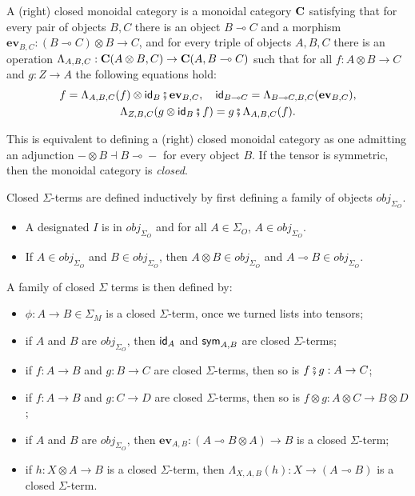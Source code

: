 \begin{definition}%
	\label{def:closed}
	A (right) closed monoidal category is a monoidal category $\mathbf{C}$ satisfying that for
	every pair of objects $B,C$ there is an object $B \multimap C$ and a morphism $\textbf{ev}_{B,C} : (B \multimap C) \otimes B \to
		C$, and for every triple of objects $A,B,C$ there is an operation $\Lambda_{A,B,C} : \mathbf{C}(A \otimes B,C) \to
		\mathbf{C}(A,B \multimap{} C)$ such that for all $f : A \otimes B \to C$ and $g : Z \to A$ the following equations hold:
	\begin{gather*}
		f = \Lambda_{A,B,C}(f) \otimes \textsf{id}_{B} \fatsemi \textbf{ev}_{B,C},
		\quad
		\textsf{id}_{B \multimap{} C} = \Lambda_{B \multimap{} C,B,C}(\textbf{ev}_{B,C}),
		\\
		\Lambda_{Z,B,C}(g \otimes \textsf{id}_{B} \fatsemi f) = g \fatsemi \Lambda_{A,B,C}(f).
	\end{gather*}
\end{definition}

This is equivalent to defining a (right) closed monoidal category as one admitting an adjunction $- \otimes B \dashv B \multimap{} -$ for every object $B$.
If the tensor is symmetric, then the monoidal category is \emph{closed}.

\begin{definition}
	Closed $\Sigma$-terms are defined inductively by first defining a family of objects $obj_{\Sigma_{O}}$.
	\begin{itemize}
		\item A designated $I$ is in $obj_{\Sigma_{O}}$ and for all $A \in \Sigma_{O}$, $A \in obj_{\Sigma_{O}}$.
		\item If $A \in obj_{\Sigma_{O}}$ and $B \in obj_{\Sigma_{O}}$, then $A \otimes B \in obj_{\Sigma_{O}}$ and $A \multimap B \in obj_{\Sigma_{O}}$.
	\end{itemize}
	A family of closed $\Sigma$ terms is then defined by:
	\begin{itemize}
		\item $\phi \colon A \to B \in \Sigma_{M}$ is a closed $\Sigma$-term, once we turned lists into tensors;
		\item if $A$ and $B$ are $obj_{\Sigma_{O}}$, then $\textsf{id}_{A}$ and $\textsf{sym}_{A,B}$ are closed $\Sigma$-terms;
		\item if $f \colon A \to B$ and $g : B \to C$ are closed $\Sigma$-terms, then so is $f \fatsemi g : A \to C$;
		\item if $f \colon A \to B$ and $g : C \to D$ are closed $\Sigma$-terms, then so is $f \otimes g \colon A \otimes C \to B \otimes D$;
		\item if $A$ and $B$ are $obj_{\Sigma_{O}}$, then $\textbf{ev}_{A,B} \colon (A \multimap B \otimes A) \to B$ is a closed $\Sigma$-term;
		\item if $h \colon X \otimes A \to B$ is a closed $\Sigma$-term, then $\Lambda_{X,A,B}(h) \colon X \to (A \multimap B)$ is a closed $\Sigma$-term.
	\end{itemize}
\end{definition}

